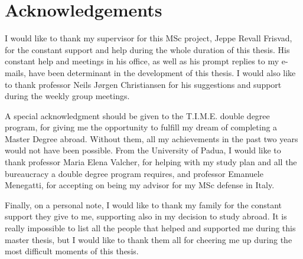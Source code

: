 \chapter{Acknowledgements}
I would like to thank my supervisor for this MSc project, Jeppe Revall Frisvad, for the constant support and help during the whole duration of this thesis. His constant help and meetings in his office, as well as his prompt replies to my e-mails, have been determinant in the development of this thesis. I would also like to thank professor Neils J\o rgen Christiansen for his suggestions and support during the weekly group meetings.

A special acknowledgment should be given to the T.I.M.E. double degree program, for giving me the opportunity to fulfill my dream of completing a Master Degree abroad. Without them, all my achievements in the past two years would not have been possible. From the University of Padua, I would like to thank professor Maria Elena Valcher, for helping with my study plan and all the bureaucracy a double degree program requires, and professor Emanuele Menegatti, for accepting on being my advisor for my MSc defense in Italy.

Finally, on a personal note, I would like to thank my family for the constant support they give to me, supporting also in my decision to study abroad. It is really impossible to list all the people that helped and supported me during this master thesis, but I would like to thank them all for cheering me up during the most difficult moments of this thesis.